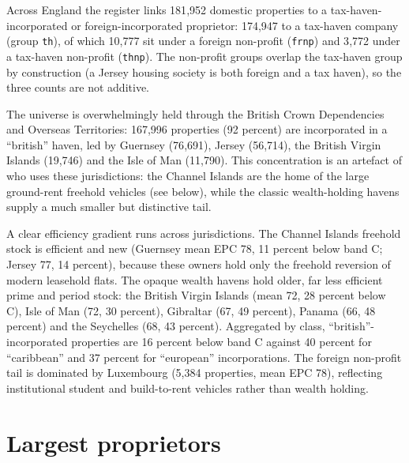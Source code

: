 \documentclass[11pt]{article}
\begin{document}
Across England the register links 181{,}952 domestic properties to a
tax-haven-incorporated or foreign-incorporated proprietor: 174{,}947 to a
tax-haven company (group \texttt{th}), of which 10{,}777 sit under a foreign
non-profit (\texttt{frnp}) and 3{,}772 under a tax-haven non-profit
(\texttt{thnp}). The non-profit groups overlap the tax-haven group by
construction (a Jersey housing society is both foreign and a tax haven), so the
three counts are not additive.

The universe is overwhelmingly held through the British Crown Dependencies and
Overseas Territories: 167{,}996 properties (92 percent) are incorporated in a
``british'' haven, led by Guernsey (76{,}691), Jersey (56{,}714), the British
Virgin Islands (19{,}746) and the Isle of Man (11{,}790). This concentration is
an artefact of who uses these jurisdictions: the Channel Islands are the home of
the large ground-rent freehold vehicles (see below), while the classic
wealth-holding havens supply a much smaller but distinctive tail.

A clear efficiency gradient runs across jurisdictions. The Channel Islands
freehold stock is efficient and new (Guernsey mean EPC 78, 11 percent below band
C; Jersey 77, 14 percent), because these owners hold only the freehold reversion
of modern leasehold flats. The opaque wealth havens hold older, far less
efficient prime and period stock: the British Virgin Islands (mean 72, 28
percent below C), Isle of Man (72, 30 percent), Gibraltar (67, 49 percent),
Panama (66, 48 percent) and the Seychelles (68, 43 percent). Aggregated by
class, ``british''-incorporated properties are 16 percent below band C against
40 percent for ``caribbean'' and 37 percent for ``european'' incorporations. The
foreign non-profit tail is dominated by Luxembourg (5{,}384 properties, mean EPC
78), reflecting institutional student and build-to-rent vehicles rather than
wealth holding.



\section{Largest proprietors}


\end{document}
